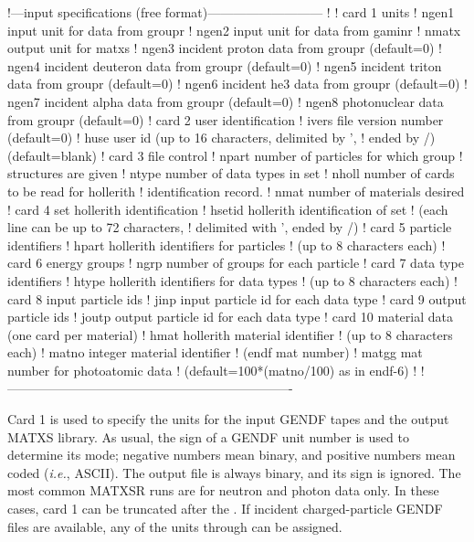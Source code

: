 \small
\begin{ccode}

   !---input specifications (free format)---------------------------
   !
   ! card 1 units
   !   ngen1     input unit for data from groupr
   !   ngen2     input unit for data from gaminr
   !   nmatx     output unit for matxs
   !   ngen3     incident proton data from groupr (default=0)
   !   ngen4     incident deuteron data from groupr (default=0)
   !   ngen5     incident triton data from groupr (default=0)
   !   ngen6     incident he3 data from groupr (default=0)
   !   ngen7     incident alpha data from groupr (default=0)
   !   ngen8     photonuclear data from groupr (default=0)
   ! card 2 user identification
   !   ivers     file version number (default=0)
   !   huse      user id (up to 16 characters, delimited by ',
   !             ended by /) (default=blank)
   ! card 3 file control
   !   npart     number of particles for which group
   !                structures are given
   !   ntype     number of data types in set
   !   nholl     number of cards to be read for hollerith
   !             identification record.
   !   nmat      number of materials desired
   ! card 4 set hollerith identification
   !   hsetid    hollerith identification of set
   !             (each line can be up to 72 characters,
   !             delimited with ', ended by /)
   ! card 5 particle identifiers
   !   hpart     hollerith identifiers for particles
   !             (up to 8 characters each)
   ! card 6 energy groups
   !   ngrp      number of groups for each particle
   ! card 7 data type identifiers
   !   htype     hollerith identifiers for data types
   !             (up to 8 characters each)
   ! card 8 input particle ids
   !   jinp     input particle id for each data type
   ! card 9 output particle ids
   !   joutp    output particle id for each data type
   ! card 10 material data (one card per material)
   !   hmat      hollerith material identifier
   !             (up to 8 characters each)
   !   matno     integer material identifier
   !             (endf mat number)
   !   matgg     mat number for photoatomic data
   !             (default=100*(matno/100) as in endf-6)
   !
   !-------------------------------------------------------------------

\end{ccode}
\normalsize

Card 1 is used to specify the units for the input GENDF tapes
and the output MATXS library.  As usual, the sign of a GENDF unit
number is used to determine its mode; negative numbers mean
binary, and positive numbers mean coded ({\it i.e.}, ASCII).
The output file is always binary, and its sign is ignored.
The most common MATXSR
runs are for neutron and photon data only.
In these cases, card 1 can be truncated after the .
If incident charged-particle GENDF files are available, any of
the units  through  can be assigned.

